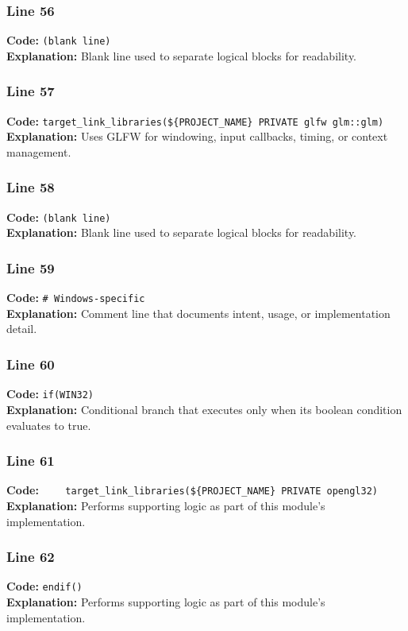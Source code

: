 \documentclass[11pt,a4paper]{article}
\begin{document}
\subsubsection*{Line 56}
\textbf{Code:} \texttt{(blank line)}\\
\textbf{Explanation:} Blank line used to separate logical blocks for readability.

\subsubsection*{Line 57}
\textbf{Code:} \verb|target_link_libraries(${PROJECT_NAME} PRIVATE glfw glm::glm)|\\
\textbf{Explanation:} Uses GLFW for windowing, input callbacks, timing, or context management.

\subsubsection*{Line 58}
\textbf{Code:} \texttt{(blank line)}\\
\textbf{Explanation:} Blank line used to separate logical blocks for readability.

\subsubsection*{Line 59}
\textbf{Code:} \verb|# Windows-specific|\\
\textbf{Explanation:} Comment line that documents intent, usage, or implementation detail.

\subsubsection*{Line 60}
\textbf{Code:} \verb|if(WIN32)|\\
\textbf{Explanation:} Conditional branch that executes only when its boolean condition evaluates to true.

\subsubsection*{Line 61}
\textbf{Code:} \verb|    target_link_libraries(${PROJECT_NAME} PRIVATE opengl32)|\\
\textbf{Explanation:} Performs supporting logic as part of this module's implementation.

\subsubsection*{Line 62}
\textbf{Code:} \verb|endif()|\\
\textbf{Explanation:} Performs supporting logic as part of this module's implementation.
\end{document}
